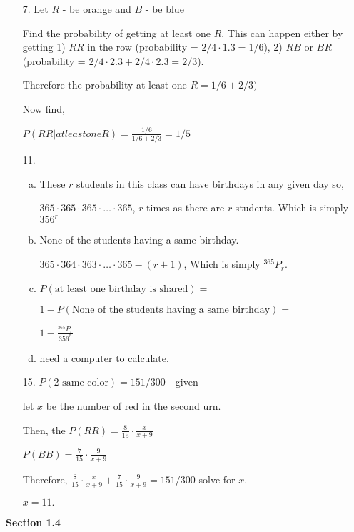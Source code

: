 \documentclass{article}\usepackage[]{graphicx}\usepackage[]{color}
\begin{document}
\begin{itemize}
\item [7.] Let $R$ - be orange and $B$ - be blue

Find the probability of getting at least one $R$. This can happen either by getting 1) $RR$ in the row (probability = $2/4\cdot1.3 = 1/6$), 2) $RB$ or $BR$ (probability = $2/4\cdot2.3 + 2/4\cdot2.3 = 2/3$). 

Therefore the probability at least one $R = 1/6 + 2/3)$

Now find,

$P(RR|at least one R) = \frac{1/6}{1/6 + 2/3} = 1/5$


\item [11.] \begin{enumerate}[(a)]
    \item These $r$ students in this class can have birthdays in any given day so,
    
    $365\cdot 365\cdot365\cdot \dots \cdot365$,  $r$ times as there are $r$ students. Which is simply $356^r$
    
    \item None of the students having a same birthday.
    
    $365\cdot 364\cdot363\cdot \dots \cdot365 - (r+1)$,  Which is simply $^{365}P_r$.
    
    \item $P(\mbox{at least one birthday is shared}) = $
    
    $1 - P(\mbox{None of the students having a same birthday}) = $ 
    
    $1 - \frac{^{365}P_r}{356^r}$
    
    \item need a computer to calculate.
\end{enumerate}


\item [15.] $P(\mbox{2 same color}) = 151/300$ - given

let $x$ be the number of red in the second urn.

Then, the $P(RR) = \frac{8}{15}\cdot\frac{x}{x+9}$

$P(BB) = \frac{7}{15}\cdot\frac{9}{x+9}$

Therefore, $\frac{8}{15}\cdot\frac{x}{x+9}+\frac{7}{15}\cdot\frac{9}{x+9} = 151/300$ solve for $x$.

$x = 11.$

\end{itemize}

\noindent
\textbf{Section 1.4}
\end{document}
